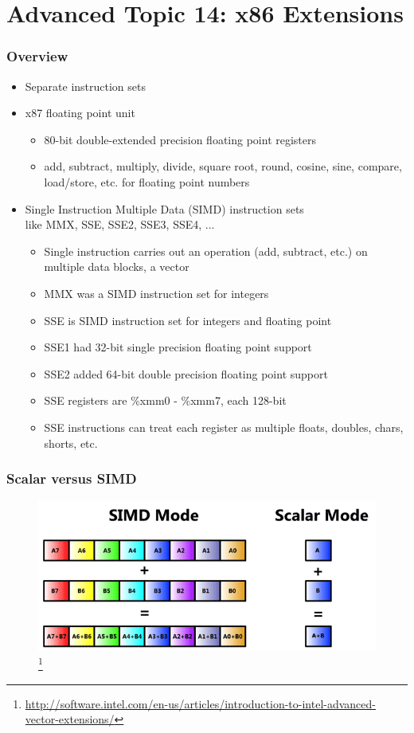 \documentclass[11pt,xcolor=dvipsnames]{beamer}
\begin{document}
\section{Advanced Topic 14: x86 Extensions}

\begin{frame}[fragile,t]
\frametitle{Overview}
\begin{itemize}
  \item Separate instruction sets
  \item x87 floating point unit
  \begin{itemize}
    \item 80-bit double-extended precision floating point registers
    \item add, subtract, multiply, divide, square root, round, cosine, sine, compare, load/store, etc. for floating point numbers
  \end{itemize}
  \pause
  \item Single Instruction Multiple Data (SIMD) instruction sets \\ like MMX, SSE, SSE2, SSE3, SSE4, ...
  \begin{itemize}
    \item Single instruction carries out an operation (add, subtract, etc.) on multiple data blocks, a vector
    \item MMX was a SIMD instruction set for integers
    \pause
    \item SSE is SIMD instruction set for integers and floating point
    \pause
    \item SSE1 had 32-bit single precision floating point support 
    \item SSE2 added 64-bit double precision floating point support
    \pause
    \item SSE registers are {\%xmm0 - \%xmm7}, each 128-bit
    \item SSE instructions can treat each register as multiple floats, doubles, chars, shorts, etc.
  \end{itemize}
\end{itemize}
\end{frame}

\begin{frame}[fragile,t]
\frametitle{Scalar versus SIMD}
\begin{figure}
\includegraphics[width=\textwidth]{figures/simd.png}
\footnote{\url{http://software.intel.com/en-us/articles/introduction-to-intel-advanced-vector-extensions/}}
\end{figure}
\end{frame}
\end{document}
